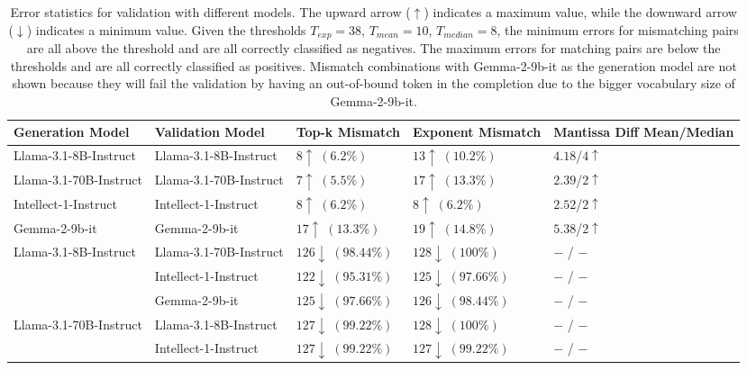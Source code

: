 \documentclass{article}
\theoremstyle{plain}
\theoremstyle{definition}
\theoremstyle{remark}
\begin{document}
\begin{table}[ht]
\caption{Error statistics for validation with different models. The upward arrow (\(\uparrow\)) indicates a maximum value, while the downward arrow (\(\downarrow\)) indicates a minimum value.
Given the thresholds $T_{exp}=38$, $T_{mean}=10$, $T_{median}=8$,
the minimum errors for mismatching pairs are all above the threshold and are all correctly classified as negatives.
The maximum errors for matching pairs are below the thresholds and are all correctly classified as positives.
Mismatch combinations with Gemma-2-9b-it as the generation model are not shown because they will fail the validation by having an out-of-bound token in the completion due to the bigger vocabulary size of Gemma-2-9b-it.
}
\label{tab:model_errs}
\vskip 0.15in
\begin{center}
\begin{small}
\begin{tabular}{p{3.8cm} p{3.8cm} p{2.2cm} p{2.2cm} p{2.3cm}}
\toprule
Generation Model & Validation Model & Top-k \newline Mismatch & Exponent \newline Mismatch & Mantissa Diff \newline Mean/Median \\
\midrule
Llama-3.1-8B-Instruct & Llama-3.1-8B-Instruct & $8\uparrow\;(6.2\%)$ & $13\uparrow\;(10.2\%)$ & $4.18$/$4\uparrow$ \\
Llama-3.1-70B-Instruct & Llama-3.1-70B-Instruct & $7\uparrow\;(5.5\%)$ & $17\uparrow\;(13.3\%)$ & $2.39$/$2\uparrow$ \\
Intellect-1-Instruct & Intellect-1-Instruct & $8\uparrow\;(6.2\%)$ & $8\uparrow\;(6.2\%)$ & $2.52$/$2\uparrow$ \\
Gemma-2-9b-it & Gemma-2-9b-it & $17\uparrow\;(13.3\%)$ & $19\uparrow\;(14.8\%)$ & $5.38$/$2\uparrow$ \\
\cmidrule(lr){1-5}
Llama-3.1-8B-Instruct & Llama-3.1-70B-Instruct & $126\downarrow\;(98.44\%)$ & $128\downarrow\;(100\%)$ & $-$ / $-$ \\
 & Intellect-1-Instruct & $122\downarrow\;(95.31\%)$ & $125\downarrow\;(97.66\%)$ & $-$ / $-$ \\
 & Gemma-2-9b-it & $125\downarrow\;(97.66\%)$ & $126\downarrow\;(98.44\%)$ & $-$ / $-$ \\
Llama-3.1-70B-Instruct & Llama-3.1-8B-Instruct & $127\downarrow\;(99.22\%)$ & $128\downarrow\;(100\%)$ & $-$ / $-$ \\
 & Intellect-1-Instruct & $127\downarrow\;(99.22\%)$ & $127\downarrow\;(99.22\%)$ & $-$ / $-$ \\

\end{tabular}
\end{small}
\end{center}
\end{table}
\end{document}
